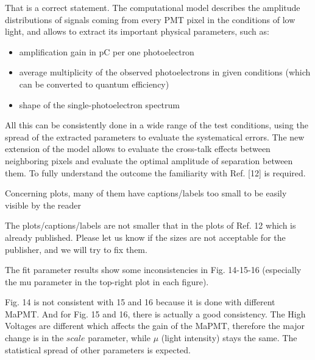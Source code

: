 \documentclass[11pt]{report}
\begin{document}
That is a correct statement.
The computational model describes the amplitude distributions of signals coming from every PMT pixel in the conditions of low light, and allows to extract its important physical parameters, such as:
\begin{itemize}
\item amplification gain in pC per one photoelectron
\item average multiplicity of the observed photoelectrons in given conditions (which can be converted to quantum efficiency)
\item shape of the single-photoelectron spectrum
\end{itemize}
All this can be consistently done in a wide range of the test conditions, using the spread of the extracted parameters to evaluate the systematical errors. The new extension of the model allows to evaluate the cross-talk effects between neighboring pixels and evaluate the optimal amplitude of separation between them.
To fully understand the outcome the familiarity with Ref. [12] is required. 



\begin{tcolorbox}[enlarge top by=2em,colbacktitle=blue!60!white,colframe=black!80!white,left=0pt,right=0pt,top=0pt,bottom=0pt,boxrule=0.3pt,title=\bfseries2.06]
Concerning plots, many of them have captions/labels too small to be easily visible by the reader
\end{tcolorbox}

The plots/captions/labels are not smaller that in the plots of Ref. 12 which is already published.
Please let us know if the sizes are not acceptable for the publisher, and we will try to fix them.


\begin{tcolorbox}[enlarge top by=2em,colbacktitle=blue!60!white,colframe=black!80!white,left=0pt,right=0pt,top=0pt,bottom=0pt,boxrule=0.3pt,title=\bfseries2.07]
The fit parameter results show some inconsistencies in Fig. 14-15-16 (especially the mu parameter in the top-right plot in each figure).
\end{tcolorbox}


Fig. 14 is not consistent with 15 and 16 because it is done with different MaPMT.
And for Fig. 15 and 16, there is actually a good consistency.
The High Voltages are different which affects the gain of the MaPMT, therefore the major change is in the $scale$ parameter, while $\mu$ (light intensity) stays the same.
The statistical spread of other parameters is expected.
\end{document}
